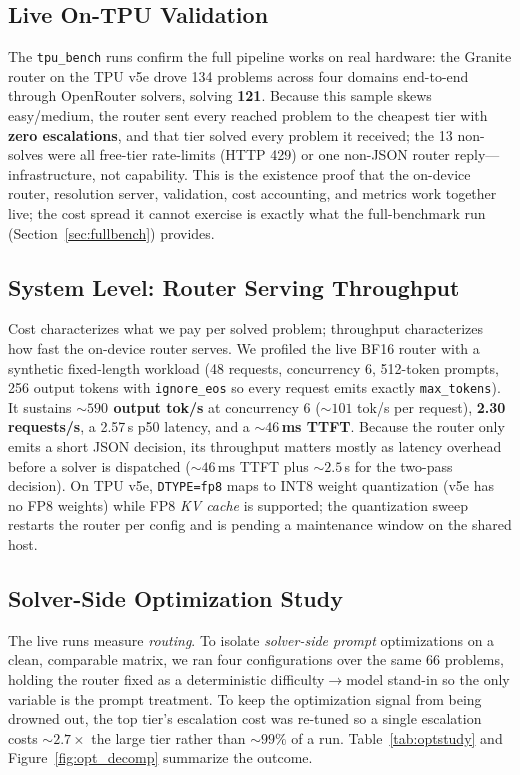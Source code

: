 \documentclass[10pt]{article}
\begin{document}
\subsection{Live On-TPU Validation}
\label{sec:live}
The \texttt{tpu\_bench} runs confirm the full pipeline works on real hardware: the
Granite router on the TPU v5e drove 134 problems across four domains end-to-end through
OpenRouter solvers, solving \textbf{121}. Because this sample skews easy/medium, the
router sent every reached problem to the cheapest tier with \textbf{zero escalations},
and that tier solved every problem it received; the 13 non-solves were all free-tier
rate-limits (HTTP 429) or one non-JSON router reply---infrastructure, not capability.
This is the existence proof that the on-device router, resolution server, validation,
cost accounting, and metrics work together live; the cost spread it cannot exercise is
exactly what the full-benchmark run (Section~\ref{sec:fullbench}) provides.

\subsection{System Level: Router Serving Throughput}
\label{sec:throughput}
Cost characterizes what we pay per solved problem; throughput characterizes how fast
the on-device router serves. We profiled the live BF16 router with a synthetic
fixed-length workload (48 requests, concurrency 6, 512-token prompts, 256 output tokens
with \texttt{ignore\_eos} so every request emits exactly \texttt{max\_tokens}). It
sustains \textbf{$\sim\!590$ output tok/s} at concurrency 6 ($\sim\!101$ tok/s per
request), \textbf{2.30 requests/s}, a 2.57\,s p50 latency, and a \textbf{$\sim\!46$\,ms
TTFT}. Because the router only emits a short JSON decision, its throughput matters
mostly as latency overhead before a solver is dispatched ($\sim\!46$\,ms TTFT plus
$\sim\!2.5$\,s for the two-pass decision). On TPU v5e, \texttt{DTYPE=fp8} maps to INT8
weight quantization (v5e has no FP8 weights) while FP8 \emph{KV cache} is supported; the
quantization sweep restarts the router per config and is pending a maintenance window on
the shared host.

\subsection{Solver-Side Optimization Study}
\label{sec:optstudy}
The live runs measure \emph{routing}. To isolate \emph{solver-side prompt}
optimizations on a clean, comparable matrix, we ran four configurations over the same
66 problems, holding the router fixed as a deterministic difficulty$\rightarrow$model
stand-in so the only variable is the prompt treatment. To keep the optimization signal
from being drowned out, the top tier's escalation cost was re-tuned so a single
escalation costs $\sim\!2.7\times$ the large tier rather than $\sim\!99\%$ of a run.
Table~\ref{tab:optstudy} and Figure~\ref{fig:opt_decomp} summarize the outcome.
\end{document}
